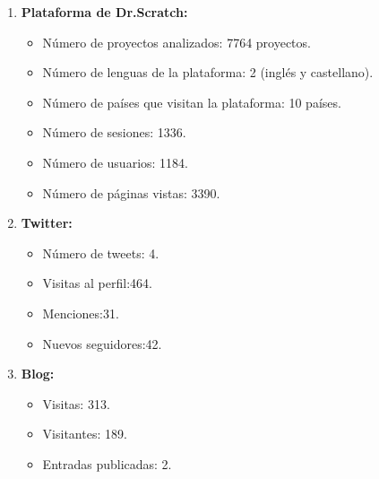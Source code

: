 \documentclass[a4paper,12pt]{letter}
\begin{document}
\begin{letter}
\begin{enumerate}  
    \item {\textbf{Plataforma de Dr.Scratch:}}
        \begin{itemize}
            \item {Número de proyectos analizados: 7764 proyectos.}
            \item {Número de lenguas de la plataforma: 2 (inglés y castellano).}
            \item {Número de países que visitan la plataforma: 10 países.}
            \item {Número de sesiones: 1336.}
            \item {Número de usuarios: 1184.}
            \item {Número de páginas vistas: 3390.}
        \end{itemize}
    \item {\textbf{Twitter:}}
        \begin{itemize}
            \item {Número de tweets: 4.}
            \item {Visitas al perfil:464.}
            \item {Menciones:31.}
            \item {Nuevos seguidores:42.}
        \end{itemize}
    \item {\textbf{Blog:}}
        \begin{itemize}
            \item {Visitas: 313.}
            \item {Visitantes: 189.}
            \item {Entradas publicadas: 2.}
        \end{itemize}

\end{enumerate}

\end{letter}
\end{document}
